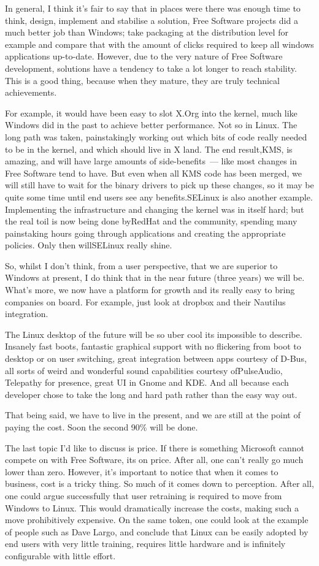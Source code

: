 \documentclass{book}
\begin{document}
In general, I think it's fair to say that in places were there was
enough time to think, design, implement and stabilise a solution, Free
Software projects did a much better job than Windows; take packaging
at the distribution level for example and compare that with the amount
of clicks required to keep all windows applications
up-to-date. However, due to the very nature of Free Software
development, solutions have a tendency to take a lot longer to reach
stability. This is a good thing, because when they mature, they are
truly technical achievements.

For example, it would have been easy to slot X.Org into the kernel,
much like Windows did in the past to achieve better performance. Not
so in Linux. The long path was taken, painstakingly working out which
bits of code really needed to be in the kernel, and which should live
in X land. The end result,KMS, is amazing, and will have large amounts
of side-benefits~--- like most changes in Free Software tend to
have. But even when all KMS code has been merged, we will still have
to wait for the binary drivers to pick up these changes, so it may be
quite some time until end users see any benefits.SELinux is also
another example. Implementing the infrastructure and changing the
kernel was in itself hard; but the real toil is now being done
byRedHat and the community, spending many painstaking hours going
through applications and creating the appropriate policies. Only then
willSELinux really shine.

So, whilst I don't think, from a user perspective, that we are
superior to Windows at present, I do think that in the near future
(three years) we will be. What's more, we now have a platform for
growth and its really easy to bring companies on board. For example,
just look at dropbox and their Nautilus integration.

The Linux desktop of the future will be so uber cool its impossible to
describe. Insanely fast boots, fantastic graphical support with no
flickering from boot to desktop or on user switching, great
integration between apps courtesy of D-Bus, all sorts of weird and
wonderful sound capabilities courtesy ofPulseAudio, Telepathy for
presence, great UI in Gnome and KDE. And all because each developer
chose to take the long and hard path rather than the easy way out.

That being said, we have to live in the present, and we are still at
the point of paying the cost. Soon the second 90\% will be done.

The last topic I'd like to discuss is price. If there is something
Microsoft cannot compete on with Free Software, its on price. After
all, one can't really go much lower than zero. However, it's important
to notice that when it comes to business, cost is a tricky thing. So
much of it comes down to perception. After all, one could argue
successfully that user retraining is required to move from Windows to
Linux. This would dramatically increase the costs, making such a move
prohibitively expensive. On the same token, one could look at the
example of people such as Dave Largo, and conclude that Linux can be
easily adopted by end users with very little training, requires little
hardware and is infinitely configurable with little effort.
\end{document}
